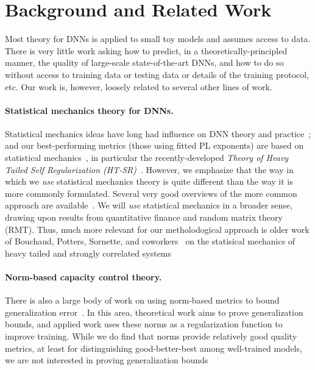 \section{Background and Related Work}
\label{sxn:background}

Most theory for DNNs is applied to small toy models and assumes access to data.
There is very little work asking how to predict, in a theoretically-principled manner, the quality of large-scale state-of-the-art DNNs, and how to do so without access to training data or testing data or details of the training protocol, etc.
Our work is, however, loosely related to several other lines of work.


\paragraph{Statistical mechanics theory for DNNs.}

Statistical mechanics ideas have long had influence on DNN theory and practice~\cite{EB01_BOOK, MM17_TR, BKPx20}; and 
our best-performing metrics (those using fitted PL exponents) are based on statistical mechanics~\cite{MM17_TR, MM18_TR, MM19_HTSR_ICML, MM19_KDD, MM20_SDM}, in particular the recently-developed \emph{Theory of Heavy Tailed Self Regularization (HT-SR)}~\cite{MM18_TR, MM19_HTSR_ICML, MM20_SDM}.  
However, we emphasize that the way in which we \emph{use} statistical mechanics theory is quite different than the way it is more commonly formulated.
Several very good overviews of the more common approach are available~\cite{EB01_BOOK, BKPx20}.
We will \emph{use} statistical mechanics in a broader sense, drawing upon results from quantitative finance and random matrix theory (RMT).
Thus, much more relevant for our metholodogical approach is older work of Bouchaud, Potters, Sornette, and coworkers~\cite{BouchaudPotters03, SornetteBook, BP11, bun2017} on the statisical mechanics of heavy tailed and strongly correlated systems


\paragraph{Norm-based capacity control theory.}

There is also a large body of work on using norm-based metrics to bound generalization error~\cite{NTS15, BFT17_TR, LMBx18_TR}.
In this area, theoretical work aims to prove generalization bounds, and applied work uses these norms as a regularization function to improve training.
While we do find that norms provide relatively good quality metrics, at least for distinguishing good-better-best among well-trained models, we are not interested in proving generalization bounds 


